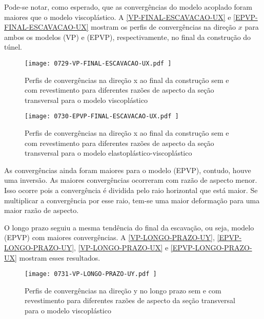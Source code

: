 Pode-se notar, como esperado, que as convergências do modelo acoplado foram maiores que o modelo viscoplástico. A \autoref{VP-FINAL-ESCAVACAO-UX} e \autoref{EPVP-FINAL-ESCAVACAO-UX} mostram os perfis de convergências na direção $x$ para ambos os modelos (VP) e (EPVP), respectivamente, no final da construção do túnel.

\begin{figure}[H]
	\begin{center}
		\texttt{[image: 0729-VP-FINAL-ESCAVACAO-UX.pdf
		]}
	\end{center}
	\caption{\label{VP-FINAL-ESCAVACAO-UX}Perfis de convergências na direção x ao final da construção sem e com revestimento para diferentes razões de aspecto da seção transversal para o modelo viscoplástico}
\end{figure}

\begin{figure}[H]
	\begin{center}
		\texttt{[image: 0730-EPVP-FINAL-ESCAVACAO-UX.pdf
		]}
	\end{center}
	\caption{\label{EPVP-FINAL-ESCAVACAO-UX}Perfis de convergências na direção x ao final da construção sem e com revestimento para diferentes razões de aspecto da seção transversal para o modelo elastoplástico-viscoplástico}
\end{figure}
As convergências ainda foram maiores para o modelo (EPVP), contudo, houve uma inversão. As maiores convergências ocorreram com razão de aspecto menor. Isso ocorre pois a convergência é dividida pelo raio horizontal que está maior. Se multiplicar a convergência por esse raio, tem-se uma maior deformação para uma maior razão de aspecto.

O longo prazo seguiu a mesma tendência do final da escavação, ou seja, modelo (EPVP) com maiores convergências. A \autoref{VP-LONGO-PRAZO-UY}, \autoref{EPVP-LONGO-PRAZO-UY}, \autoref{VP-LONGO-PRAZO-UX} e \autoref{EPVP-LONGO-PRAZO-UX} mostram esses resultados.

\begin{figure}[H]
	\begin{center}
		\texttt{[image: 0731-VP-LONGO-PRAZO-UY.pdf
		]}
	\end{center}
	\caption{\label{VP-LONGO-PRAZO-UY}Perfis de convergências na direção y no longo prazo sem e com revestimento para diferentes razões de aspecto da seção transversal para o modelo viscoplástico}
\end{figure}


